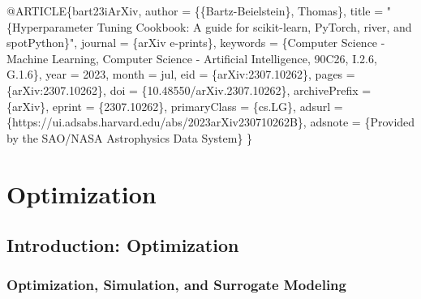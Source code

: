 \documentclass[
  letterpaper,
  DIV=11,
  numbers=noendperiod]{scrreprt}
\newenvironment{Shaded}{\begin{snugshade}}{\end{snugshade}}
\newcommand{\NormalTok}[1]{\textcolor[rgb]{0.00,0.23,0.31}{#1}}
\begin{document}
\begin{Shaded}
\begin{Highlighting}[]
\NormalTok{@ARTICLE\{bart23iArXiv,}
\NormalTok{      author = \{\{Bartz{-}Beielstein\}, Thomas\},}
\NormalTok{      title = "\{Hyperparameter Tuning Cookbook:}
\NormalTok{          A guide for scikit{-}learn, PyTorch, river, and spotPython\}",}
\NormalTok{     journal = \{arXiv e{-}prints\},}
\NormalTok{    keywords = \{Computer Science {-} Machine Learning,}
\NormalTok{      Computer Science {-} Artificial Intelligence, 90C26, I.2.6, G.1.6\},}
\NormalTok{         year = 2023,}
\NormalTok{        month = jul,}
\NormalTok{          eid = \{arXiv:2307.10262\},}
\NormalTok{        pages = \{arXiv:2307.10262\},}
\NormalTok{          doi = \{10.48550/arXiv.2307.10262\},}
\NormalTok{archivePrefix = \{arXiv\},}
\NormalTok{       eprint = \{2307.10262\},}
\NormalTok{ primaryClass = \{cs.LG\},}
\NormalTok{       adsurl = \{https://ui.adsabs.harvard.edu/abs/2023arXiv230710262B\},}
\NormalTok{      adsnote = \{Provided by the SAO/NASA Astrophysics Data System\}}
\NormalTok{\}}

\end{Highlighting}
\end{Shaded}

\part{Optimization}

\chapter{Introduction: Optimization}\label{introduction-optimization}

\section{Optimization, Simulation, and Surrogate
Modeling}\label{optimization-simulation-and-surrogate-modeling}
\end{document}
